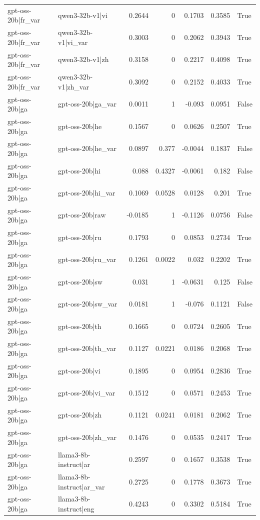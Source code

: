 \begin{table}
\begin{tabular}{l l r r r r l}
gpt-oss-20b|fr_var & qwen3-32b-v1|vi & 0.2644 & 0 & 0.1703 & 0.3585 & True \\
gpt-oss-20b|fr_var & qwen3-32b-v1|vi_var & 0.3003 & 0 & 0.2062 & 0.3943 & True \\
gpt-oss-20b|fr_var & qwen3-32b-v1|zh & 0.3158 & 0 & 0.2217 & 0.4098 & True \\
gpt-oss-20b|fr_var & qwen3-32b-v1|zh_var & 0.3092 & 0 & 0.2152 & 0.4033 & True \\
gpt-oss-20b|ga & gpt-oss-20b|ga_var & 0.0011 & 1 & -0.093 & 0.0951 & False \\
gpt-oss-20b|ga & gpt-oss-20b|he & 0.1567 & 0 & 0.0626 & 0.2507 & True \\
gpt-oss-20b|ga & gpt-oss-20b|he_var & 0.0897 & 0.377 & -0.0044 & 0.1837 & False \\
gpt-oss-20b|ga & gpt-oss-20b|hi & 0.088 & 0.4327 & -0.0061 & 0.182 & False \\
gpt-oss-20b|ga & gpt-oss-20b|hi_var & 0.1069 & 0.0528 & 0.0128 & 0.201 & True \\
gpt-oss-20b|ga & gpt-oss-20b|raw & -0.0185 & 1 & -0.1126 & 0.0756 & False \\
gpt-oss-20b|ga & gpt-oss-20b|ru & 0.1793 & 0 & 0.0853 & 0.2734 & True \\
gpt-oss-20b|ga & gpt-oss-20b|ru_var & 0.1261 & 0.0022 & 0.032 & 0.2202 & True \\
gpt-oss-20b|ga & gpt-oss-20b|sw & 0.031 & 1 & -0.0631 & 0.125 & False \\
gpt-oss-20b|ga & gpt-oss-20b|sw_var & 0.0181 & 1 & -0.076 & 0.1121 & False \\
gpt-oss-20b|ga & gpt-oss-20b|th & 0.1665 & 0 & 0.0724 & 0.2605 & True \\
gpt-oss-20b|ga & gpt-oss-20b|th_var & 0.1127 & 0.0221 & 0.0186 & 0.2068 & True \\
gpt-oss-20b|ga & gpt-oss-20b|vi & 0.1895 & 0 & 0.0954 & 0.2836 & True \\
gpt-oss-20b|ga & gpt-oss-20b|vi_var & 0.1512 & 0 & 0.0571 & 0.2453 & True \\
gpt-oss-20b|ga & gpt-oss-20b|zh & 0.1121 & 0.0241 & 0.0181 & 0.2062 & True \\
gpt-oss-20b|ga & gpt-oss-20b|zh_var & 0.1476 & 0 & 0.0535 & 0.2417 & True \\
gpt-oss-20b|ga & llama3-8b-instruct|ar & 0.2597 & 0 & 0.1657 & 0.3538 & True \\
gpt-oss-20b|ga & llama3-8b-instruct|ar_var & 0.2725 & 0 & 0.1778 & 0.3673 & True \\
gpt-oss-20b|ga & llama3-8b-instruct|eng & 0.4243 & 0 & 0.3302 & 0.5184 & True \\

\end{tabular}
\end{table}

